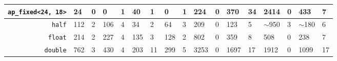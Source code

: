 \begin{landscape}
\begin{table}[H]
\begin{tabular}{|r|l|l|l|l||l|l|l|l||l|l|l|l||l|l|l|l|}
\texttt{ap\_fixed\textless{}24, 18\textgreater{}} & 24                       & 0                        & 0                       & 1                             & 40                       & 1                        & 0                       & 1                            & 224                      & 0                        & 370                     & 34                           & 2414                     & 0                        & 433                     & 7                            \\ \hline
\texttt{half}                                     & 112                      & 2                        & 106                     & 4                             & 34                       & 2                        & 64                      & 3                            & 209                      & 0                        & 123                     & 5                            & $\sim$950                & 3                        & $\sim$180               & 6                            \\ \hline
\texttt{float}                                    & 214                      & 2                        & 227                     & 4                             & 135                      & 3                        & 128                     & 2                            & 802                      & 0                        & 359                     & 8                            & 508                      & 0                        & 238                     & 7                            \\ \hline
\texttt{double}                                   & 762                      & 3                        & 430                     & 4                             & 203                      & 11                       & 299                     & 5                            & 3253                     & 0                        & 1697                    & 17                           & 1912                     & 0                        & 1099                    & 17                           \\ \hline
\end{tabular}
\label{ch3:tab:type_area_time}
\end{table}

\end{landscape}

